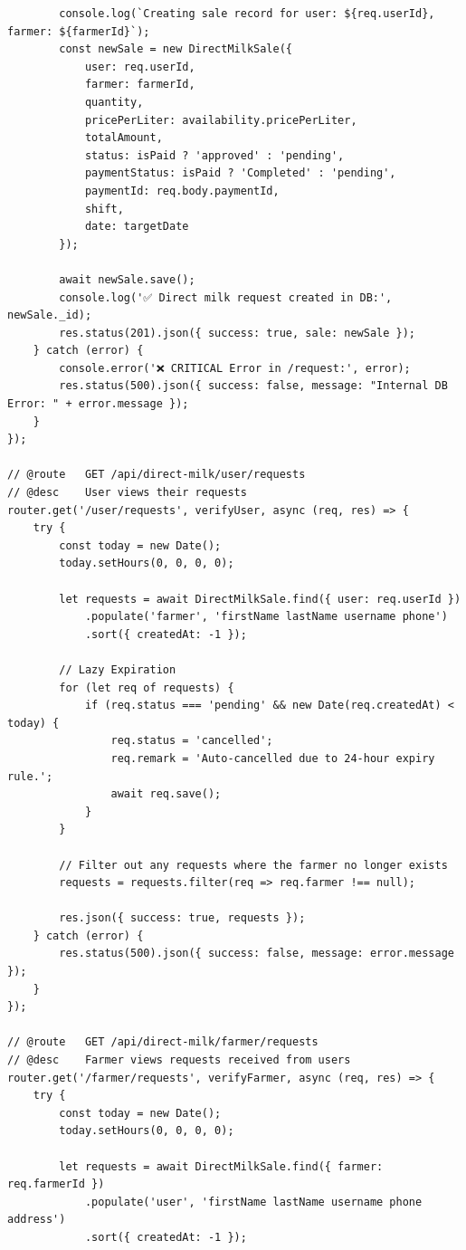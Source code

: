 \documentclass[12pt,a4paper]{report}
\begin{document}
\begin{lstlisting}
        console.log(`Creating sale record for user: ${req.userId}, farmer: ${farmerId}`);
        const newSale = new DirectMilkSale({
            user: req.userId,
            farmer: farmerId,
            quantity,
            pricePerLiter: availability.pricePerLiter,
            totalAmount,
            status: isPaid ? 'approved' : 'pending',
            paymentStatus: isPaid ? 'Completed' : 'pending',
            paymentId: req.body.paymentId,
            shift,
            date: targetDate
        });

        await newSale.save();
        console.log('✅ Direct milk request created in DB:', newSale._id);
        res.status(201).json({ success: true, sale: newSale });
    } catch (error) {
        console.error('❌ CRITICAL Error in /request:', error);
        res.status(500).json({ success: false, message: "Internal DB Error: " + error.message });
    }
});

// @route   GET /api/direct-milk/user/requests
// @desc    User views their requests
router.get('/user/requests', verifyUser, async (req, res) => {
    try {
        const today = new Date();
        today.setHours(0, 0, 0, 0);

        let requests = await DirectMilkSale.find({ user: req.userId })
            .populate('farmer', 'firstName lastName username phone')
            .sort({ createdAt: -1 });

        // Lazy Expiration
        for (let req of requests) {
            if (req.status === 'pending' && new Date(req.createdAt) < today) {
                req.status = 'cancelled';
                req.remark = 'Auto-cancelled due to 24-hour expiry rule.';
                await req.save();
            }
        }

        // Filter out any requests where the farmer no longer exists
        requests = requests.filter(req => req.farmer !== null);

        res.json({ success: true, requests });
    } catch (error) {
        res.status(500).json({ success: false, message: error.message });
    }
});

// @route   GET /api/direct-milk/farmer/requests
// @desc    Farmer views requests received from users
router.get('/farmer/requests', verifyFarmer, async (req, res) => {
    try {
        const today = new Date();
        today.setHours(0, 0, 0, 0);

        let requests = await DirectMilkSale.find({ farmer: req.farmerId })
            .populate('user', 'firstName lastName username phone address')
            .sort({ createdAt: -1 });


\end{lstlisting}
\end{document}
